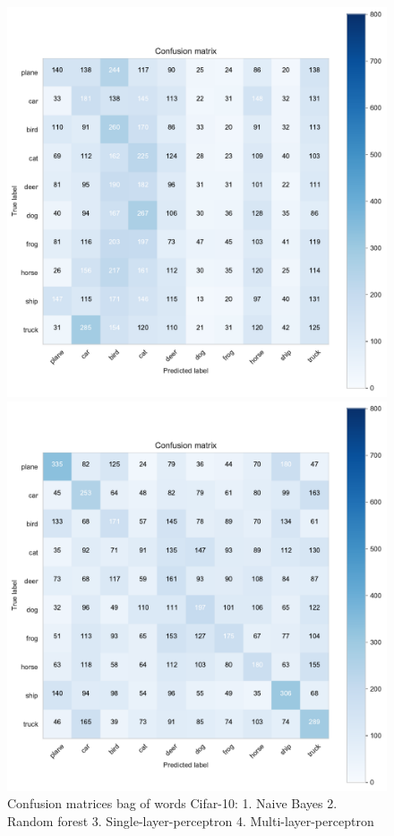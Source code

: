 \documentclass[11pt]{article}
\begin{document}
\begin{figure}[H]
\begin{minipage}[c]{0.5\textwidth}
\end{minipage}
\begin{minipage}[c]{0.5\textwidth}
\includegraphics[width=1\linewidth]{figures/Cifar/CM__ppn_BOW.pdf}
\end{minipage}
\begin{minipage}[c]{0.5\textwidth}
\includegraphics[width=1\linewidth]{figures/Cifar/CM__MLP_BOW.pdf}
\end{minipage}
\caption{Confusion matrices bag of words Cifar-10: 1. Naive Bayes 2. Random forest 3. Single-layer-perceptron 4. Multi-layer-perceptron}
\label{CV_Matrices_Cifar_BOW}
\end{figure}
\end{document}
